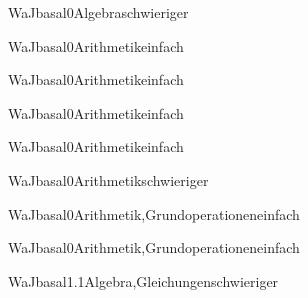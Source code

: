 \documentclass[12pt]{article}
\begin{document}
\begin{Add}{WaJ}{basal0}{Algebra}{schwieriger}
\end{Add}

\begin{Add}{WaJ}{basal0}{Arithmetik}{einfach}
\end{Add}

\begin{Add}{WaJ}{basal0}{Arithmetik}{einfach}
\end{Add}

\begin{Add}{WaJ}{basal0}{Arithmetik}{einfach}
\end{Add}

\begin{Add}{WaJ}{basal0}{Arithmetik}{einfach}
\end{Add}

\begin{Add}{WaJ}{basal0}{Arithmetik}{schwieriger}
\end{Add}

\begin{Add}{WaJ}{basal0}{Arithmetik,Grundoperationen}{einfach}
\end{Add}

\begin{Add}{WaJ}{basal0}{Arithmetik,Grundoperationen}{einfach}
\end{Add}

\begin{Add}{WaJ}{basal1.1}{Algebra,Gleichungen}{schwieriger}
\end{Add}
\end{document}
